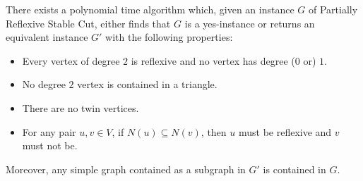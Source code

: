 \documentclass[10pt,a4paper]{amsart}
\begin{document}
\begin{lemma}\label{lem:gen-obs}
There exists a polynomial time algorithm which, given an instance $G$ of {\sc Partially Reflexive Stable Cut}, either finds that $G$ is a yes-instance or returns an equivalent instance $G'$ with the following properties:
\begin{itemize}
    \item[1.] Every vertex of degree $2$ is reflexive and no vertex has degree ($0$ or) $1$.
    \item[2.] No degree $2$ vertex is contained in a triangle.
    \item[3.] There are no twin vertices.
    \item[4.] For any pair $u,v \in V$, if $N(u) \subseteq N(v)$, then $u$ must be reflexive and $v$ must not be.
\end{itemize}

Moreover, any simple graph contained as a subgraph in $G'$ is contained in $G$.

\end{lemma}
\end{document}

